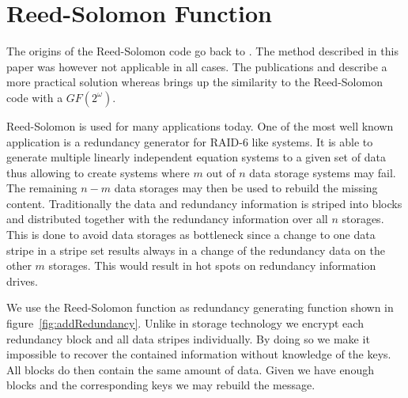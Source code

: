 \documentclass[9pt,journal,compsoc]{IEEEtran}
\begin{document}
%


\appendices

\section{Reed-Solomon Function\label{sec:reedSolomon}}
The origins of the Reed-Solomon code go back to \cite{reed1960polynomial}. The method described in this paper was however not applicable in all cases. The publications \cite{karnin1983secret} and \cite{Rabin:1989:EDI:62044.62050} describe a more practical solution whereas \cite{preparata1989holographic} brings up the similarity to the Reed-Solomon code with a $GF(2^\omega)$. 

Reed-Solomon is used for many applications today. One of the most well known application is a redundancy generator for RAID-6 like systems. It is able to generate multiple linearly independent equation systems to a given set of data thus allowing to create systems where $m$ out of $n$ data storage systems may fail. The remaining  $n-m$ data storages may then be used to rebuild the missing content. Traditionally the data and redundancy information is striped into blocks and distributed together with the redundancy information over all $n$ storages. This is done to avoid data storages as bottleneck since a change to one data stripe  in a stripe set results always in a change of the redundancy data on the other $m$ storages. This would result in hot spots on redundancy information drives.

We use the Reed-Solomon function as redundancy generating function shown in figure~\ref{fig:addRedundancy}. Unlike in storage technology we encrypt each redundancy block and all data stripes individually. By doing so we make it impossible to recover the contained information without knowledge of the keys. All blocks do then contain the same amount of data. Given we have enough blocks and the corresponding keys we may rebuild the message. 
\end{document}
